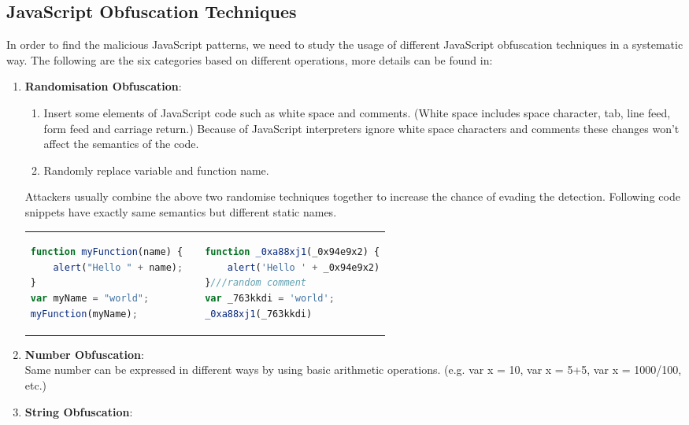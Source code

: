 \documentclass[11pt]{article}
\begin{document}
\subsection{JavaScript Obfuscation Techniques}
In order to find the malicious JavaScript patterns, we need to study the usage of different JavaScript obfuscation techniques in a systematic way. The following are the six categories based on different operations, more details can be found in\cite{ObfuscationTechniques}:
\begin{enumerate}
 	\item \textbf{Randomisation Obfuscation}: 
 	\begin{enumerate}
 		\item Insert some elements of JavaScript code such as white space \cite{WhiteSpaceRandomisation} and comments. (White space includes space character, tab, line feed, form feed and carriage return.) Because of JavaScript interpreters ignore white space characters and comments these changes won't affect the semantics of the code.
		\item Randomly replace variable and function name.  
 	\end{enumerate}
 	Attackers usually combine the above two randomise techniques together to increase the chance of evading the detection. Following code snippets have exactly same semantics but different static names.  \\
	\begin{tabular}{p{7cm}p{0.5cm}p{7cm}}
\begin{lstlisting}[language=JavaScript, title=(original code)]
function myFunction(name) {
    alert("Hello " + name);
}
var myName = "world";
myFunction(myName); 
			\end{lstlisting} & & 
			\begin{lstlisting}[language=JavaScript, title=(using randomisation)]
function _0xa88xj1(_0x94e9x2) {
    alert('Hello ' + _0x94e9x2)
}///random comment
var _763kkdi = 'world';
_0xa88xj1(_763kkdi)
			\end{lstlisting}
	\end{tabular} 
 	\item \textbf{Number Obfuscation}:  \\ 
 			Same number can be expressed in different ways by using basic arithmetic operations. (e.g. var x = 10, var x = 5+5, var x = 1000/100, etc.)
	\item \textbf{String Obfuscation}: \\

\end{enumerate}
\end{document}
